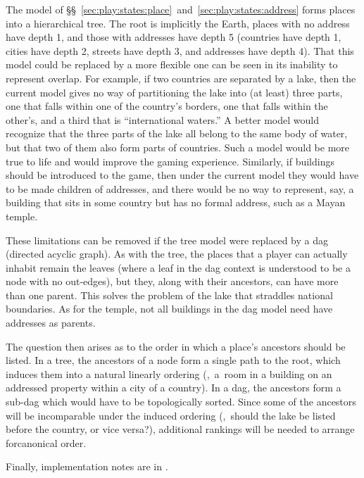 The model
of \S\S~\ref{sec:play:states:place}~and~\ref{sec:play:states:address}
forms places into a hierarchical tree. The root is implicitly the
Earth, places with no address have depth 1, and those with addresses
have depth 5 (countries have depth 1, cities have depth 2, streets
have depth 3, and addresses have depth 4). That this model could be
replaced by a more flexible one can be seen in its inability to
represent overlap. For example, if two countries are separated by a
lake, then the current model gives no way of partitioning the lake
into (at least) three parts, one that falls within one of the
country's borders, one that falls within the other's, and a third that
is ``international waters.'' A better model would recognize that the
three parts of the lake all belong to the same body of water, but that
two of them also form parts of countries. Such a model would be more
true to life and would improve the gaming experience. Similarly, if
buildings should be introduced to the game, then under the current
model they would have to be made children of addresses, and there
would be no way to represent, say, a building that sits in some
country but has no formal address, such as a Mayan temple.

These limitations can be removed if the tree model were replaced by a
dag (directed acyclic graph). As with the tree, the places that a
player can actually inhabit remain the leaves (where a leaf in the dag
context is understood to be a node with no out-edges), but they, along
with their ancestors, can have more than one parent. This solves the
problem of the lake that straddles national boundaries. As for the
temple, not all buildings in the dag model need have addresses as
parents.

The question then arises as to the order in which a place's ancestors
should be listed. In a tree, the ancestors of a node form a single
path to the root, which induces them into a natural linearly ordering
(\eg,~a~room in a building on an addressed property within a city of a
country). In a dag, the ancestors form a sub-dag which would have to
be topologically sorted. Since some of the ancestors will be
incomparable under the induced ordering (\eg,~should the lake be
listed before the country, or vice versa?), additional rankings
will be needed to arrange forcanonical order.

Finally, implementation notes are in .
